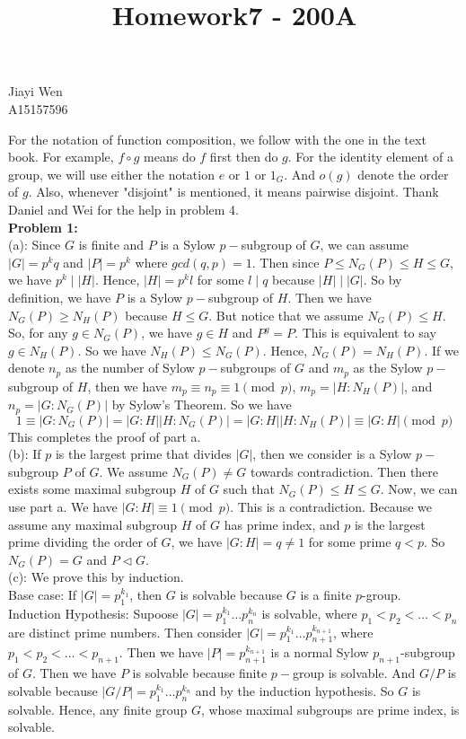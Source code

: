 \documentclass[12pt]{amsart}
\newcommand{\normal}{\triangleleft}
\begin{document}
\title{Homework7 - 200A}
\maketitle
\begin{center}
    Jiayi Wen\\
    A15157596
\end{center}
\indent For the notation of function composition, we follow with the one in the text book. For example, $f \circ g$ means do $f$ first then do $g$. For the identity element of a group, we will use either the notation $e$ or $1$ or $1_G$. And $o(g)$ denote the order of $g$. Also, whenever "disjoint" is mentioned, it means pairwise disjoint. Thank Daniel and Wei for the help in problem 4.\\
\textbf{Problem 1:}\\
(a): Since $G$ is finite and $P$ is a Sylow $p-$subgroup of $G$, we can assume $|G| =p^kq$ and $|P|= p^k$ where $gcd(q,p)=1$. Then since $P\leq N_G(P)\leq H\leq G$, we have $p^k\mid |H|$. Hence, $|H|=p^kl$ for some $l\mid q$ because $|H|\mid |G|$. So by definition, we have $P$ is a Sylow $p-$subgroup of $H$. Then we have $N_G(P)\geq N_H(P)$ because $H\leq G$. But notice that we assume $N_G(P)\leq H$. So, for any $g\in N_G(P)$, we have $g\in H$ and $P^g=P$. This is equivalent to say $g\in N_H(P)$. So we have $N_H(P)\leq N_G(P)$. Hence, $N_G(P)=N_H(P)$. If we denote $n_p$ as the number of Sylow $p-$subgroups of $G$ and $m_p$ as the Sylow $p-$subgroup of $H$, then we have $m_p\equiv n_p\equiv 1\pmod{p}$, $m_p=|H:N_H(P)|$, and $n_p=|G:N_G(P)|$ by Sylow's Theorem. So we have 
\[1\equiv |G:N_G(P)|=|G:H||H:N_G(P)|=|G:H||H:N_H(P)|\equiv |G:H| \pmod{p}\]
This completes the proof of part a.\\
(b): If $p$ is the largest prime that divides $|G|$, then we consider is a Sylow $p-$subgroup $P$ of $G$. We assume $N_G(P)\neq G$ towards contradiction. Then there exists some maximal subgroup $H$ of $G$ such that $N_G(P)\leq H\leq G$. Now, we can use part a. We have $|G:H|\equiv 1\pmod{p}$. This is a contradiction. Because we assume any maximal subgroup $H$ of $G$ has prime index, and $p$ is the largest prime dividing the order of $G$, we have $|G:H|=q\neq 1$ for some prime $q< p$. So $N_G(P)=G$ and $P\normal G$.\\
(c): We prove this by induction.\\
Base case: If $|G|=p_1^{k_1}$, then $G$ is solvable because $G$ is a finite $p$-group.\\
Induction Hypothesis: Supoose $|G|=p_1^{k_1}\dots p_n^{k_n}$ is solvable, where $p_1<p_2<\dots<p_n$ are distinct prime numbers. Then consider $|G|=p_1^{k_1}\dots p_{n+1}^{k_{n+1}}$, where $p_1<p_2<\dots<p_{n+1}$. Then we have $|P|=p_{n+1}^{k_{n+1}}$ is a normal Sylow $p_{n+1}$-subgroup of $G$. Then we have $P$ is solvable because finite $p-$group is solvable. And $G/P$ is solvable because $|G/P|=p_1^{k_1}\dots p_n^{k_n}$ and by the induction hypothesis. So $G$ is solvable. Hence, any finite group $G$, whose maximal subgroups are prime index, is solvable.
\end{document}
